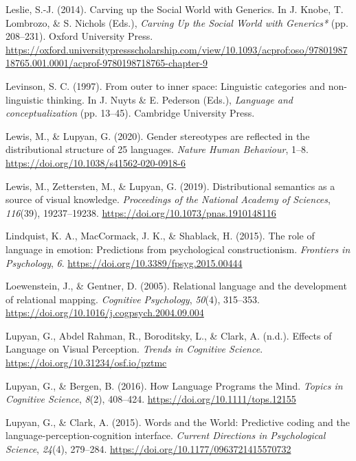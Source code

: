 \documentclass[11pt,man]{article}
\newlength{\cslhangindent}
\newenvironment{cslreferences}%
  {\setlength{\parindent}{0pt}%
  \everypar{\setlength{\hangindent}{\cslhangindent}}\ignorespaces}%
  {\par}
\begin{document}
\begin{cslreferences}
\leavevmode\hypertarget{ref-leslie_carving_2014}{}%
Leslie, S.-J. (2014). Carving up the Social World with Generics. In J.
Knobe, T. Lombrozo, \& S. Nichols (Eds.), \emph{Carving Up the Social
World with Generics*} (pp. 208--231). Oxford University Press.
\url{https://oxford.universitypressscholarship.com/view/10.1093/acprof:oso/9780198718765.001.0001/acprof-9780198718765-chapter-9}

\leavevmode\hypertarget{ref-levinson_outer_1997}{}%
Levinson, S. C. (1997). From outer to inner space: Linguistic categories
and non-linguistic thinking. In J. Nuyts \& E. Pederson (Eds.),
\emph{Language and conceptualization} (pp. 13--45). Cambridge University
Press.

\leavevmode\hypertarget{ref-lewis_gender_2020}{}%
Lewis, M., \& Lupyan, G. (2020). Gender stereotypes are reflected in the
distributional structure of 25 languages. \emph{Nature Human Behaviour},
1--8. \url{https://doi.org/10.1038/s41562-020-0918-6}

\leavevmode\hypertarget{ref-lewis_distributional_2019}{}%
Lewis, M., Zettersten, M., \& Lupyan, G. (2019). Distributional
semantics as a source of visual knowledge. \emph{Proceedings of the
National Academy of Sciences}, \emph{116}(39), 19237--19238.
\url{https://doi.org/10.1073/pnas.1910148116}

\leavevmode\hypertarget{ref-lindquist_role_2015}{}%
Lindquist, K. A., MacCormack, J. K., \& Shablack, H. (2015). The role of
language in emotion: Predictions from psychological constructionism.
\emph{Frontiers in Psychology}, \emph{6}.
\url{https://doi.org/10.3389/fpsyg.2015.00444}

\leavevmode\hypertarget{ref-loewenstein_relational_2005}{}%
Loewenstein, J., \& Gentner, D. (2005). Relational language and the
development of relational mapping. \emph{Cognitive Psychology},
\emph{50}(4), 315--353.
\url{https://doi.org/10.1016/j.cogpsych.2004.09.004}

\leavevmode\hypertarget{ref-lupyan_effects_nodate}{}%
Lupyan, G., Abdel Rahman, R., Boroditsky, L., \& Clark, A. (n.d.).
Effects of Language on Visual Perception. \emph{Trends in Cognitive
Science}. \url{https://doi.org/10.31234/osf.io/pztmc}

\leavevmode\hypertarget{ref-lupyan_how_2016}{}%
Lupyan, G., \& Bergen, B. (2016). How Language Programs the Mind.
\emph{Topics in Cognitive Science}, \emph{8}(2), 408--424.
\url{https://doi.org/10.1111/tops.12155}

\leavevmode\hypertarget{ref-lupyan_words_2015}{}%
Lupyan, G., \& Clark, A. (2015). Words and the World: Predictive coding
and the language-perception-cognition interface. \emph{Current
Directions in Psychological Science}, \emph{24}(4), 279--284.
\url{https://doi.org/10.1177/0963721415570732}


\end{cslreferences}
\end{document}
